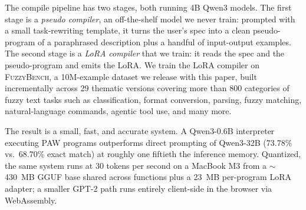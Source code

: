 \documentclass{article}
\theoremstyle{plain}
\theoremstyle{definition}
\theoremstyle{remark}
\begin{document}
The compile pipeline has two stages, both running 4B Qwen3 models. The first stage is a \emph{pseudo compiler}, an off-the-shelf model we never train: prompted with a small task-rewriting template, it turns the user's spec into a clean pseudo-program of a paraphrased description plus a handful of input-output examples. The second stage is a \emph{LoRA compiler} that we train: it reads the spec and the pseudo-program and emits the LoRA. We train the LoRA compiler on \textsc{FuzzyBench}, a 10M-example dataset we release with this paper, built incrementally across 29 thematic versions covering more than 800 categories of fuzzy text tasks such as classification, format conversion, parsing, fuzzy matching, natural-language commands, agentic tool use, and many more.

The result is a small, fast, and accurate system. A Qwen3-0.6B interpreter executing PAW programs outperforms direct prompting of Qwen3-32B (73.78\% vs.\ 68.70\% exact match) at roughly one fiftieth the inference memory. Quantized, the same system runs at 30 tokens per second on a MacBook M3 from a $\sim$430~MB GGUF base shared across functions plus a 23~MB per-program LoRA adapter; a smaller GPT-2 path runs entirely client-side in the browser via WebAssembly.

\end{document}
